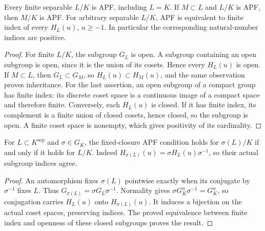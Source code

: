 \begin{proposition}
\label{fw:apf-elementary}
\leanok
Every finite separable $L/K$ is APF, including $L=K$.
If $M\subset L$ and $L/K$ is APF, then $M/K$ is APF.
For arbitrary separable $L/K$, APF is equivalent to finite index of every
$H_L(u)$, $u\geq-1$. In particular the corresponding natural-number
indices are positive.
\end{proposition}
\begin{proof}
For finite $L/K$, the subgroup $G_L$ is open. A subgroup containing an
open subgroup is open, since it is the union of its cosets. Hence every
$H_L(u)$ is open. If $M\subset L$, then $G_L\subset G_M$, so
$H_L(u)\subset H_M(u)$, and the same observation proves inheritance.
For the last assertion, an open subgroup of a compact group has finite
index: its discrete coset space is a continuous image of a compact space
and therefore finite. Conversely, each $H_L(u)$ is closed. If it has
finite index, its complement is a finite union of closed cosets, hence
closed, so the subgroup is open. A finite coset space is nonempty,
which gives positivity of its cardinality.
\end{proof}

\begin{lemma}
\label{fw:apf-conjugacy}
\leanok
For $L\subset K^{\mathrm{sep}}$ and $\sigma\in G_K$, the fixed-closure
APF condition holds for $\sigma(L)/K$ if and only if it holds for $L/K$.
Indeed $H_{\sigma(L)}(u)=\sigma H_L(u)\sigma^{-1}$, so their actual
subgroup indices agree.
\end{lemma}
\begin{proof}
An automorphism fixes $\sigma(L)$ pointwise exactly when its conjugate by
$\sigma^{-1}$ fixes $L$. Thus $G_{\sigma(L)}=\sigma G_L\sigma^{-1}$.
Normality gives $\sigma G_K^u\sigma^{-1}=G_K^u$, so conjugation carries
$H_L(u)$ onto $H_{\sigma(L)}(u)$. It induces a bijection on the actual
coset spaces, preserving indices. The proved equivalence between
finite index and openness of these closed subgroups proves the result.
\end{proof}

